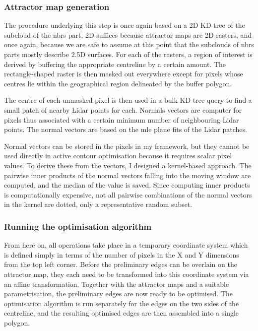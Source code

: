 \subsubsection{Attractor map generation}

The procedure underlying this step is once again based on a 2D KD-tree of the subcloud of the \ac{nbrs} part. 2D suffices because attractor maps are 2D rasters, and once again, because we are safe to assume at this point that the subclouds of \ac{nbrs} parts mostly describe 2.5D surfaces. For each of the rasters, a region of interest is derived by buffering the appropriate centreline by a certain amount. The rectangle-shaped raster is then masked out everywhere except for pixels whose centres lie within the geographical region delineated by the buffer polygon.

The centre of each unmasked pixel is then used in a bulk KD-tree query to find a small patch of nearby Lidar points for each. Normals vectors are computer for pixels thus associated with a certain minimum number of neighbouring Lidar points. The normal vectors are based on the \ac{mle} plane fits of the Lidar patches.

Normal vectors can be stored in the pixels in my framework, but they cannot be used directly in active contour optimisation because it requires scalar pixel values. To derive these from the vectors, I designed a kernel-based approach. The pairwise inner products of the normal vectors falling into the moving window are computed, and the median of the value is saved. Since computing inner products is computationally expensive, not all pairwise combinations of the normal vectors in the kernel are dotted, only a representative random subset.

\subsubsection{Running the optimisation algorithm}

From here on, all operations take place in a temporary coordinate system which is defined simply in terms of the number of pixels in the X and Y dimensions from the top left corner. Before the preliminary edges can be overlain on the attractor map, they each need to be transformed into this coordinate system via an affine transformation. Together with the attractor maps and a suitable parametrisation, the preliminary edges are now ready to be optimised. The optimisation algorithm is run separately for the edges on the two sides of the centreline, and the resulting optimised edges are then assembled into a single polygon.

